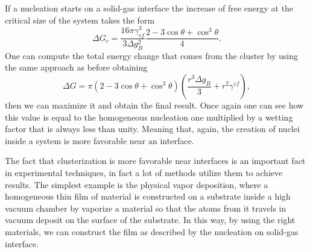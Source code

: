 {
    If a nucleation starts on a solid-gas interface the increase of free energy at the critical size of the system takes the form
    \begin{equation}
        \Delta G_c = \frac{16\pi\gamma_{vf}^3}{3\Delta g_B^2}\frac{2- 3\cos\theta + \cos^3\theta}{4}.
    \end{equation}
}
{
    One can compute the total energy change that comes from the cluster by using the same approach as before obtaining
    \begin{equation}
        \Delta G = \pi(2 - 3\cos\theta + \cos^3\theta)\left( \frac{r^3\Delta g_B}{3} + r^2\gamma^{vf} \right),
    \end{equation}
    then we can maximize it and obtain the final result.
}
\noindent
Once again one can see how this value is equal to the homogeneous nucleation one multiplied by a wetting factor that is always less than unity. Meaning that, again, the creation of nuclei inside a system is more favorable near an interface.

\nt
{
    The fact that clusterization is more favorable near interfaces is an important fact in experimental techniques, in fact a lot of methods utilize them to achieve results. The simplest example is the physical vapor deposition, where a homogeneous thin film of material is constructed on a substrate inside a high vacuum chamber by vaporize a material so that the atoms from it travels in vacuum deposit on the surface of the substrate. In this way, by using the right materials, we can construct the film as described by the nucleation on solid-gas interface.
}